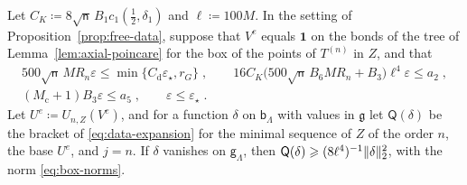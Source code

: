 \documentclass[11pt]{preprint}
\newcommand{\id}{\mathbf 1}
\DeclarePairedDelimiter{\norm}{\lVert}{\rVert}
\numberwithin{equation}{section}
\begin{document}
\begin{lemma}\label{lem:free-hessian}
Let $C_K \coloneqq 8\sqrt{\mathsf n}\,B_1c_1(\frac{1}{2}, \delta_1)$ and $\ell \coloneqq 100M$. In the setting of Proposition~\ref{prop:free-data}, suppose that $V^e$ equals $\id$ on the bonds of the tree of Lemma~\ref{lem:axial-poincare} for the box of the points of $T^{(n)}$ in $Z$, and that
\begin{equation}\label{eq:free-hessian-smallness}
\begin{gathered}
    500\sqrt{\mathsf n}\,MR_n\varepsilon \leqslant \min\{ C_{\mathrm d}\varepsilon_\star, r_G \}\;,
    \qquad
    16C_K\bigl(500\sqrt{\mathsf n}\,B_6MR_n + B_3\bigr)\ell^4\varepsilon \leqslant a_2\;,\\
    (M_{\mathrm c} + 1)B_3\varepsilon \leqslant a_5\;,
    \qquad
    \varepsilon \leqslant \varepsilon_\star\;.
\end{gathered}
\end{equation}
Let $U^e \coloneqq U_{n,Z}(V^e)$, and for a function $\delta$ on $\mathsf b_\Lambda$ with values in $\mathfrak g$ let $\mathsf Q(\delta)$ be the bracket of \eqref{eq:data-expansion} for the minimal sequence of $Z$ of the order $n$, the base $U^e$, and $j = n$. If $\delta$ vanishes on $\mathsf g_\Lambda$, then $\mathsf Q(\delta) \geqslant (8\ell^4)^{-1}\norm\delta_2^2$, with the norm \eqref{eq:box-norms}.
\end{lemma}
\end{document}
